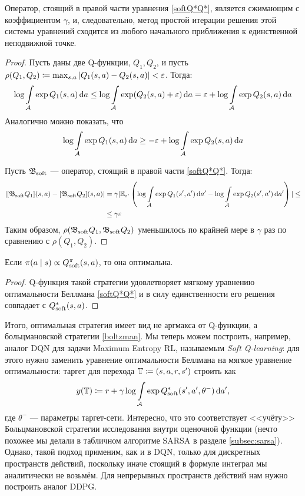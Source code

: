 \begin{theorem}
Оператор, стоящий в правой части уравнения \eqref{softQ*Q*}, является сжимающим с коэффициентом $\gamma$, и, следовательно, метод простой итерации решения этой системы уравнений сходится из любого начального приближения к единственной неподвижной точке.
\begin{proof}
Пусть даны две Q-функции, $Q_1, Q_2$, и пусть $\rho(Q_1, Q_2) \coloneqq \max_{s, a} | Q_1(s, a) \HM- Q_2(s, a) | \HM< \eps$. Тогда:
$$
\log \int\limits_{\mathcal{A}} \exp Q_1(s, a) \mathop{}\!\mathrm{d} a \le \log \int\limits_{\mathcal{A}} \exp (Q_2(s, a) + \varepsilon) \mathop{}\!\mathrm{d} a = \varepsilon + \log \int\limits_{\mathcal{A}} \exp Q_2(s, a) \mathop{}\!\mathrm{d} a
$$
Аналогично можно показать, что 
$$
\log \int\limits_{\mathcal{A}} \exp Q_1(s, a) \mathop{}\!\mathrm{d} a \ge -\varepsilon + \log \int\limits_{\mathcal{A}} \exp Q_2(s, a) \mathop{}\!\mathrm{d} a
$$

Пусть $\mathfrak{B}_{\mathrm{soft}}$ --- оператор, стоящий в правой части \eqref{softQ*Q*}. Тогда:
\begin{align*}
| [\mathfrak{B}_{\mathrm{soft}} Q_1](s, a) - [\mathfrak{B}_{\mathrm{soft}} Q_2](s, a) | &= \gamma | \mathbb{E}_{s'} \left( \log \int\limits_{\mathcal{A}} \exp Q_1(s', a') \mathop{}\!\mathrm{d} a' - \log \int\limits_{\mathcal{A}} \exp Q_2(s', a') \mathop{}\!\mathrm{d} a' \right) | \le \\ 
&\le \gamma \varepsilon
\end{align*}
Таким образом, $\rho(\mathfrak{B}_{\mathrm{soft}} Q_1, \mathfrak{B}_{\mathrm{soft}} Q_2)$ уменьшилось по крайней мере в $\gamma$ раз по сравнению с $\rho(Q_1, Q_2)$.
\end{proof}
\end{theorem}

\begin{proposition}
Если $\pi(a \mid s) \propto Q^{\pi}_{\mathrm{soft}}(s, a)$, то она оптимальна.
\begin{proof}
Q-функция такой стратегии удовлетворяет мягкому уравнению оптимальности Беллмана \eqref{softQ*Q*} и в силу единственности его решения совпадает с $Q^*_{\mathrm{soft}}(s, a)$.
\end{proof}
\end{proposition}

Итого, оптимальная стратегия имеет вид не аргмакса от Q-функции, а больцмановской стратегии \eqref{boltzman}. Мы теперь можем построить, например, аналог DQN для задачи Maximum Entropy RL, называемым \emph{Soft Q-learning}: для этого нужно заменить уравнение оптимальности Беллмана на мягкое уравнение оптимальности: таргет для перехода $\mathbb{T} \coloneqq (s, a, r, s')$ строить как
$$y(\mathbb{T}) \coloneqq r + \gamma \log \int\limits_{\mathcal{A}} \exp Q^*_{\mathrm{soft}}(s', a', \theta^{-}) \mathop{}\!\mathrm{d} a',$$
где $\theta^{-}$ --- параметры таргет-сети. Интересно, что это соответствует <<учёту>> Больцмановской стратегии исследования внутри оценочной функции (нечто похожее мы делали в табличном алгоритме SARSA в разделе \ref{subsec:sarsa}). Однако, такой подход применим, как и в DQN, только для дискретных пространств действий, поскольку иначе стоящий в формуле интеграл мы аналитически не возьмём. Для непрерывных пространств действий нам нужно построить аналог DDPG.

